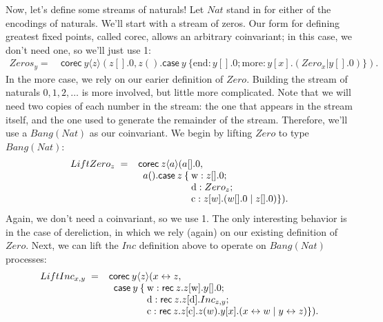 \documentclass[orivec,envcountsame]{llncs}
\newcommand{\mkwd}[1]{\mathsf{#1}}
\newcommand{\tkwd}[1]{\textsf{#1}}
\newcommand{\link}[2]{#1 \leftrightarrow #2}
\newcommand{\rec}[1]{\mkwd{rec}\:#1}
\newcommand{\corec}[5]{\mkwd{corec}\:#1 \langle #2 \rangle (#4,#5)}
\newcommand{\clabel}[1]{\mathrm{#1}}
\renewcommand{\case}[2]{\mkwd{case}\:#1\:\{#2\}}
\newcommand{\sel}[2]{#1[\clabel{#2}]}
\begin{document}
Now, let's define some streams of naturals!  Let $Nat$ stand in for either of the encodings of
naturals.  We'll start with a stream of zeros.  Our form for defining greatest fixed points, called
\tkwd{corec}, allows an arbitrary coinvariant; in this case, we don't need one, so we'll just use 1:
%
{\small\begin{align*}
  Zeros_y =\ &\corec{y}{z}{1}{z[].0}{z().\case{y}{\clabel{end}: y[].0; \clabel{more}: y[x].(Zero_x | y[].0)}}.
\end{align*}}
%
In the \textrm{more} case, we rely on our earier definition of $Zero$.  Building the stream of
naturals $0,1,2,\dots$ is more involved, but little more complicated. Note that we will need two
copies of each number in the stream: the one that appears in the stream itself, and the one used to
generate the remainder of the stream.  Therefore, we'll use a $Bang(Nat)$ as our coinvariant.  We
begin by lifting $Zero$ to type $Bang(Nat)$:
%
{\small\[\begin{array}{r@{\hspace{2mm}}c@{\hspace{2mm}}l@{\hspace{0mm}}l@{\:}l}
  LiftZero_z & = & \multicolumn{3}{l}{\mkwd{corec} \: z \langle a \rangle (a[].0,} \\
  & & \quad & a().\mkwd{case}\: z \: \{ &\clabel{w}: z[].0; \\
  & & & & \clabel{d}: Zero_z; \\
  & & & & \clabel{c}: z[w].(w[].0 \mid z[].0) \}).
\end{array}\]}
%
Again, we don't need a coinvariant, so we use 1.  The only interesting behavior is in the case of
dereliction, in which we rely (again) on our existing definition of $Zero$.  Next, we can lift the
$Inc$ definition above to operate on $Bang(Nat)$ processes:
%
{\small\[\begin{array}{r@{\hspace{2mm}}c@{\hspace{2mm}}l@{\hspace{0mm}}l@{\:}l}
  LiftInc_{x,y} & = & \multicolumn{3}{l}{\mkwd{corec} \: y \langle z \rangle (\link{x}{z},} \\
  & & \quad & \mkwd{case} \: y \: \{ & \clabel{w}: \rec{z}.\sel{z}{w}.y[].0; \\
  & & & & \clabel{d}: \rec{z}.\sel{z}{d}.Inc_{z,y}; \\
  & & & & \clabel{c}: \rec{z}.\sel{z}{c}.z(w).y[x].(\link{x}{w} \mid \link{y}{z}) \}).
\end{array}\]}
\end{document}
